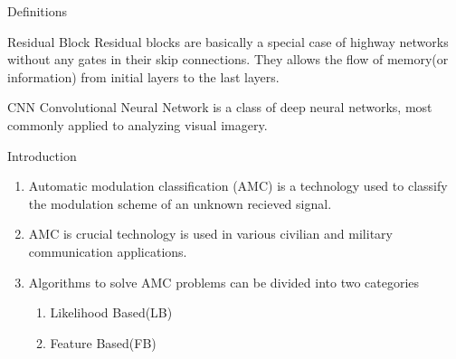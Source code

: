 \documentclass{beamer}
\begin{document}
\begin{frame}{Definitions}
\begin{block}{Residual Block}
Residual blocks are basically a special case of highway networks without any gates in their skip connections. They allows the flow of memory(or information) from initial layers to the last layers.
\end{block}
\begin{block}{CNN}
Convolutional Neural Network is a class of deep neural networks, most commonly applied to analyzing visual imagery.
\end{block}
\end{frame}
\begin{frame}{Introduction}
\begin{enumerate}[]
    \item Automatic modulation classification (AMC) is a technology used to classify the modulation scheme of an unknown recieved signal.
    \item AMC is crucial technology is used in various civilian and military communication applications.
    \item Algorithms to solve AMC problems can be divided into two categories
    \begin{enumerate}[]
        \item Likelihood Based(LB)
        \item Feature Based(FB)
    \end{enumerate}
\end{enumerate}
    
\end{frame}
\end{document}
